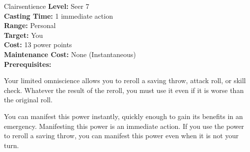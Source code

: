 {Clairsentience}
{
	\textbf{Level:}
	Seer 7\\
	\textbf{Casting Time:}
	1 immediate action\\
	\textbf{Range:}
	Personal\\
	\textbf{Target:}
	You\\
	\textbf{Cost:}
	13 power points\\
	\textbf{Maintenance Cost:}
	None (Instantaneous)\\
	\textbf{Prerequisites:}
	\\
}
{
	Your limited omniscience allows you to reroll a saving throw, attack roll, or skill check. Whatever the result of the reroll, you must use it even if it is worse than the original roll.

	You can manifest this power instantly, quickly enough to gain its benefits in an emergency. Manifesting this power is an immediate action. If you use the power to reroll a saving throw, you can manifest this power even when it is not your turn.
}